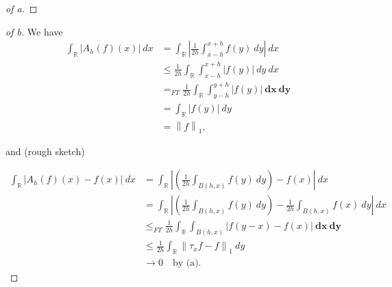\begin{solution}
\begin{proof}[of a]
\end{proof}

\begin{proof}[of b]

We have
\begin{align*}
\int_{\mathbb{R}}{\left\lvert {A_h(f)(x)} \right\rvert} ~dx 
&= \int_{\mathbb{R}}{\left\lvert {\frac{1}{2h} \int_{x-h}^{x+h} f(y)~dy} \right\rvert} ~dx \\
&\leq \frac{1}{2h} \int_{\mathbb{R}}\int_{x-h}^{x+h} {\left\lvert {f(y)} \right\rvert} ~dy ~dx    \\
&=_{FT} \frac{1}{2h} \int_{\mathbb{R}}\int_{y-h}^{y+h} {\left\lvert {f(y)} \right\rvert} ~\mathbf{dx} ~\mathbf{dy}    \\
&= \int_{\mathbb{R}}{\left\lvert {f(y)} \right\rvert} ~{dy} \\
&= {\left\lVert {f} \right\rVert}_1
,\end{align*}

and (rough sketch)

\begin{align*}
\int_{\mathbb{R}}{\left\lvert {A_h(f)(x) - f(x)} \right\rvert} ~dx 
&= \int_{\mathbb{R}}{\left\lvert { \left(\frac{1}{2h} \int_{B(h, x)} f(y)~dy\right) - f(x)} \right\rvert}~dx \\
&= \int_{\mathbb{R}}{\left\lvert { \left(\frac{1}{2h} \int_{B(h, x)} f(y)~dy\right) - \frac{1}{2h}\int_{B(h, x)} f(x) ~dy} \right\rvert}~dx \\
&\leq_{FT} \frac{1}{2h} \int_{\mathbb{R}}\int_{B(h, x)}{\left\lvert { f(y-x) - f(x)} \right\rvert} ~\mathbf{dx} ~\mathbf{dy} \\
&\leq \frac 1 {2h} \int_{\mathbb{R}}{\left\lVert {\tau_x f - f} \right\rVert}_1 ~dy \\
&\to 0 \quad\text{by (a)}
.\end{align*}

\end{proof}

\end{solution}

